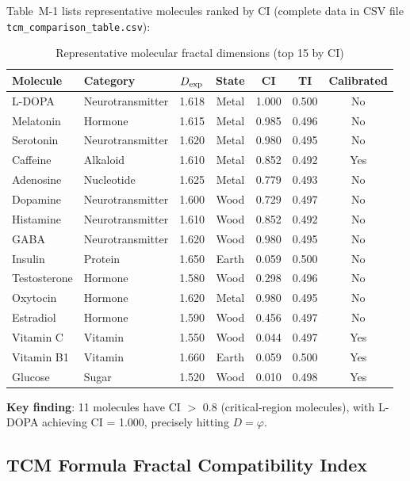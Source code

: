 \documentclass[12pt,a4paper,twocolumn]{article}
\renewcommand{\phi}{\varphi}
\begin{document}
Table~M-1 lists representative molecules ranked by CI (complete data in CSV file \texttt{tcm\_comparison\_table.csv}):
\begin{table}[H]
\centering
\footnotesize
\caption{Representative molecular fractal dimensions (top 15 by CI)}
\begin{tabular}{l|l|c|c|c|c|c}
\hline
\textbf{Molecule} & \textbf{Category} & $D_{\rm exp}$ & \textbf{State} & \textbf{CI} & \textbf{TI} & \textbf{Calibrated} \\
\hline
L-DOPA & Neurotransmitter & 1.618 & Metal & 1.000 & 0.500 & No \\
Melatonin & Hormone & 1.615 & Metal & 0.985 & 0.496 & No \\
Serotonin & Neurotransmitter & 1.620 & Metal & 0.980 & 0.495 & No \\
Caffeine & Alkaloid & 1.610 & Metal & 0.852 & 0.492 & Yes \\
Adenosine & Nucleotide & 1.625 & Metal & 0.779 & 0.493 & No \\
Dopamine & Neurotransmitter & 1.600 & Wood & 0.729 & 0.497 & No \\
Histamine & Neurotransmitter & 1.610 & Wood & 0.852 & 0.492 & No \\
GABA & Neurotransmitter & 1.620 & Wood & 0.980 & 0.495 & No \\
Insulin & Protein & 1.650 & Earth & 0.059 & 0.500 & No \\
Testosterone & Hormone & 1.580 & Wood & 0.298 & 0.496 & No \\
Oxytocin & Hormone & 1.620 & Metal & 0.980 & 0.495 & No \\
Estradiol & Hormone & 1.590 & Wood & 0.456 & 0.497 & No \\
Vitamin C & Vitamin & 1.550 & Wood & 0.044 & 0.497 & Yes \\
Vitamin B1 & Vitamin & 1.660 & Earth & 0.059 & 0.500 & Yes \\
Glucose & Sugar & 1.520 & Wood & 0.010 & 0.498 & Yes \\
\hline
\end{tabular}
\end{table}

\textbf{Key finding}: 11 molecules have CI $>$ 0.8 (critical-region molecules), with L-DOPA achieving CI = 1.000, precisely hitting $D = \phi$.

\subsection{TCM Formula Fractal Compatibility Index}
\label{subsec:fci_table_en}
\end{document}
